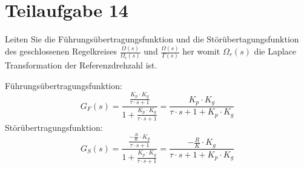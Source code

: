 \section{Teilaufgabe 14}
\begin{aufgabe}
Leiten Sie die Führungsübertragungsfunktion und die Störübertagungsfunktion 
des geschlossenen Regelkreises $\frac{\Omega(s)}{\Omega_r(s)}$ und 
$\frac{\Omega(s)}{\Gamma(s)}$ her womit $\Omega_r(s)$ die Laplace 
Transformation der Referenzdrehzahl ist.
\end{aufgabe}
Führungsübertragungsfunktion: 
\[ G_F(s) 
    = \frac{\frac{K_p \cdot K_g}{\tau \cdot s + 1}}
        {1 + \frac{K_p \cdot K_g}{\tau \cdot s + 1}}
    = \frac{K_p \cdot K_g}{\tau \cdot s + 1 + K_p \cdot K_g}
\]
Störübertragungsfunktion:
\[ G_S(s)
    = \frac{\frac{-\frac{R}{K} \cdot K_g}{\tau \cdot s + 1}}
        {1 + \frac{K_p \cdot K_g}{\tau \cdot s + 1}}
    = \frac{-\frac{R}{K} \cdot K_g}{\tau \cdot s + 1 + K_p \cdot K_g}
\]
